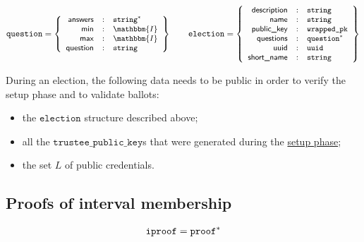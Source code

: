\documentclass[a4paper]{article}
\newcommand{\I}{\mathbbm{I}}
\newcommand{\jstring}{\texttt{string}}
\newcommand{\tpk}{\texttt{trustee\_public\_key}}
\newcommand{\election}{\texttt{election}}
\begin{document}
\newcommand{\minlabel}{\textsf{min}}
\newcommand{\maxlabel}{\textsf{max}}
\newcommand{\answers}{\textsf{answers}}

\begin{gather*}
  \question=\left\{\small
    \begin{array}{rcl}
      \answers&:&\jstring^\ast\\
      \minlabel&:&\I\\
      \maxlabel&:&\I\\
      \textsf{question}&:&\jstring
    \end{array}
  \right\}
  \qquad
  \election=\left\{\small
    \begin{array}{rcl}
      \textsf{description}&:&\jstring\\
      \textsf{name}&:&\jstring\\
      \textsf{public\_key}&:&\texttt{wrapped\_pk}\\
      \textsf{questions}&:&\texttt{question}^\ast\\
      \textsf{uuid}&:&\texttt{uuid}\\
      \textsf{short\_name}&:&\jstring
    \end{array}
  \right\}
\end{gather*}

\newcommand{\answer}{\texttt{answer}}
\newcommand{\signature}{\texttt{signature}}
\newcommand{\iproofs}{\textsf{individual\_proofs}}
\newcommand{\oproof}{\textsf{overall\_proof}}
\newcommand{\choices}{\textsf{choices}}
\newcommand{\iprove}{\textsf{iprove}}

During an election, the following data needs to be public in order to
verify the setup phase and to validate ballots:
\begin{itemize}
\item the $\election$ structure described above;
\item all the $\tpk$s that were generated during the
  \hyperref[election-setup]{setup phase};
\item the set $L$ of public credentials.
\end{itemize}

\subsection{Proofs of interval membership}

\begin{gather*}
  \texttt{iproof}=\texttt{proof}^\ast
\end{gather*}
\end{document}
